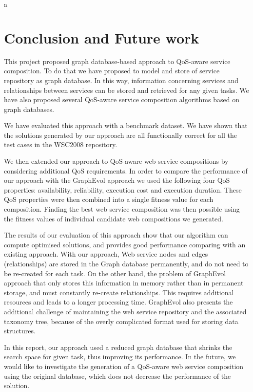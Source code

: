 a\chapter{Conclusion and Future work}\label{C:conc}

This project proposed graph database-based approach to QoS-aware service composition. To do that we have proposed to model and store of service repository as graph database. In this way, information concerning services and relationships between services can be stored and retrieved for any given tasks. We have also proposed several QoS-aware service composition algorithms based on graph databases.\par

We have evaluated this approach with a benchmark dataset. We have shown that the solutions generated by our approach are all functionally correct for all the test cases in the WSC2008 repository.\par

We then extended our approach to QoS-aware web service compositions by considering additional QoS requirements. In order to compare the performance of our approach with the GraphEvol approach we used the following four QoS properties: availability, reliability, execution cost and execution duration. These QoS properties were then combined into a single fitness value for each composition. Finding the best web service composition was then possible using the fitness values of individual candidate web compositions we generated.\par

The results of our evaluation of this approach show that our algorithm can compute optimised solutions, and provides good performance comparing with an existing approach. With our approach, Web service nodes and edges (relationships) are stored in the Graph database permanently, and do not need to be re-created for each task. On the other hand, the problem of GraphEvol approach that only stores this information in memory rather than in permanent storage, and must constantly re-create relationships. This requires additional resources and leads to a longer processing time. GraphEvol also presents the additional challenge of maintaining the web service repository and the associated taxonomy tree, because of the overly complicated format used for storing data structures.\par

In this report, our approach used a reduced graph database that shrinks the search space for given task, thus improving its performance. In the future, we would like to investigate the generation of a QoS-aware web service composition using the original database, which does not decrease the performance of the solution. \par

